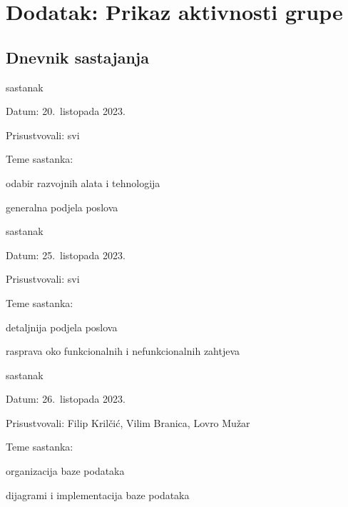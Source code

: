 \chapter*{Dodatak: Prikaz aktivnosti grupe}
		
		\section*{Dnevnik sastajanja}
		
		
		
		\begin{packed_enum}
			\item  sastanak
			
			\item[] \begin{packed_item}
				\item Datum: 20.\ listopada 2023.
				\item Prisustvovali: svi
				\item Teme sastanka:
				\begin{packed_item}
					\item  odabir razvojnih alata i tehnologija
					\item  generalna podjela poslova
				\end{packed_item}
			\end{packed_item}
			
			\item  sastanak
			\item[] \begin{packed_item}
				\item Datum: 25.\ listopada 2023.
				\item Prisustvovali: svi
				\item Teme sastanka:
				\begin{packed_item}
					\item  detaljnija podjela poslova
					\item  rasprava oko funkcionalnih i nefunkcionalnih zahtjeva
				\end{packed_item}
			\end{packed_item}

			\item  sastanak
			\item[] \begin{packed_item}
				\item Datum: 26.\ listopada 2023.
				\item Prisustvovali: Filip Krilčić, Vilim Branica, Lovro Mužar
				\item Teme sastanka:
				\begin{packed_item}
					\item  organizacija baze podataka
					\item  dijagrami i implementacija baze podataka
				\end{packed_item}
			\end{packed_item}
			

\end{packed_enum}
